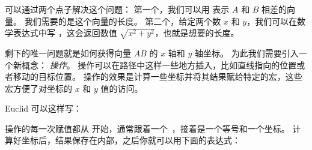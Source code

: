 可以通过两个点子解决这个问题：
第一个，我们可以用  表示 $A$ 和 $B$ 相差的向量。
我们需要的是这个向量的长度。
第二个，给定两个数 $x$ 和 $y$，我们可以在数学表达式中写 \ltz{)}，这会返回数值 $\sqrt{x^2+y^2}$，也就是想要的长度。

剩下的唯一问题就是如何获得向量 $AB$ 的 $x$ 轴和 $y$ 轴坐标。
为此我们需要引入一个新概念： \emph{操作}。
 操作可以在路径中这样一些地方插入，比如直线指向的位置或者移动的目标位置。
 操作的效果是计算一些坐标并将其结果赋给特定的宏，这些宏方便了对坐标的 $x$ 和 $y$ 值的访问。

Euclid 可以这样写：

\eohs

\begin{codeexample}[]
\end{codeexample}

\bohs

 操作的每一次赋值都从 \ltz{\\p} 开始，通常跟着一个~{\color{blue}}，接着是一个等号和一个坐标。
计算好坐标后，结果保存在内部，之后你就可以用下面的表达式：

